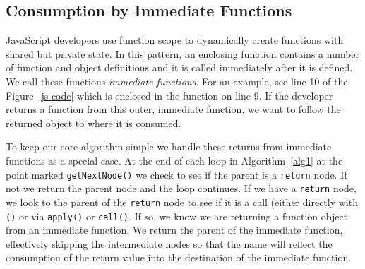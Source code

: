 \documentclass[10pt, preprint]{sigplanconf}
\begin{document}
\begin{table}
\centering
{}
\caption{Nodes produce identifiers in the function object consumption summary. Identifiers with a star in the table can be expressions as well as simple identifiers; we explain how we reduce expressions to pseudo-identifier in ~\ref{sec:general-element-naming}.}
\label{table:node-types} 
\end{table}

\subsection{Consumption by Immediate Functions}
\label{sec:immediate}
JavaScript developers use function scope to dynamically create functions with shared but private state. In this pattern, an enclosing function contains a number of function and object definitions and it is called immediately after it is defined. We call these functions \textit{immediate functions}.  For an example, see line 10 of the Figure~\ref{js-code} which is enclosed in the function on line 9. If the developer returns a function from this outer, immediate function, we want to follow the returned object to where it is consumed. 

To keep our core algorithm simple we handle these returns from immediate functions as a special case. At the end of each loop in Algorithm~\ref{alg1} at the point marked \verb|getNextNode()| we check to see if the parent is a \verb|return| node.  If not we return the parent node and the loop continues. If we have a \verb|return| node, we look to the parent of the \verb|return| node to see if it is a call (either directly with \verb|()| or via \verb|apply()| or \verb|call()|. If so, we know we are returning a function object from an immediate function.  We return the parent of the immediate function, effectively skipping the intermediate nodes so that the name will reflect the consumption of the return value into the destination of the immediate function.
\end{document}
